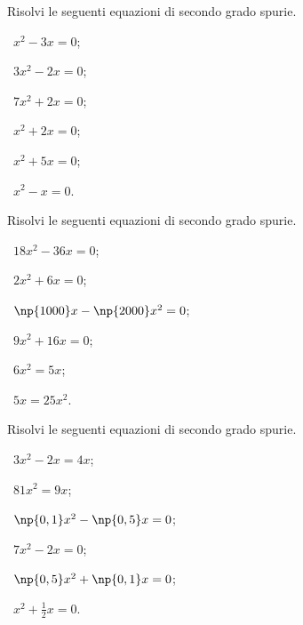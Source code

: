 \begin{esercizio}[\Ast]
\label{ese:3.5}
Risolvi le seguenti equazioni di secondo grado spurie.
\begin{multicols}{3}
 \begin{enumeratea}
 \item~$x^{2} - 3 x = 0$;
 \item~$3 x^{2} - 2 x = 0$;
 \item~$7 x^{2} + 2 x = 0$;
 \item~$x^{2} + 2 x = 0$;
 \item~$x^{2} + 5 x = 0$;
 \item~$x^{2} - x = 0$.
 \end{enumeratea}
 \end{multicols}
\end{esercizio}

\begin{esercizio}[\Ast]
\label{ese:3.6}
Risolvi le seguenti equazioni di secondo grado spurie.
\begin{multicols}{3}
 \begin{enumeratea}
 \item~$18 x^{2} - 36 x = 0$;
 \item~$2x^{2} + 6x = 0$;
 \item~$\np{1000} x - \np{2000} x^{2} = 0$;
 \item~$9x^{2} + 16x = 0$;
 \item~$6 x^{2} = 5 x$;
 \item~$5x = 25x^{2}$.
 \end{enumeratea}
 \end{multicols}
\end{esercizio}
\pagebreak
\begin{esercizio}[\Ast]
 \label{ese:3.7}
Risolvi le seguenti equazioni di secondo grado spurie.
\begin{multicols}{3}
 \begin{enumeratea}
 \item~$3 x^{2} - 2 x = 4 x$;
 \item~$81x^{2} = 9x$;
 \item~$\np{0,1} x^{2} - \np{0,5} x = 0$;
 \item~$7x^{2} - 2x = 0$;
 \item~$\np{0,5} x^{2} + \np{0,1} x = 0$;
 \item~$x^{2} + \frac{1}{2} x = 0$.
 \end{enumeratea}
 \end{multicols}
\end{esercizio}

